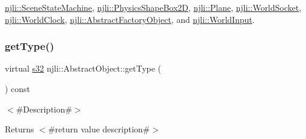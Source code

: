 \mbox{\hyperlink{classnjli_1_1_scene_state_machine_a5a3f221a1b765b690d2cfd45e8a5e574}{njli\+::\+Scene\+State\+Machine}}, \mbox{\hyperlink{classnjli_1_1_physics_shape_box2_d_a176b8cfb4df192e48295adc6e97a1e8d}{njli\+::\+Physics\+Shape\+Box2D}}, \mbox{\hyperlink{classnjli_1_1_plane_a9a7ccbc86c1f486cd816f0f4f3e9c550}{njli\+::\+Plane}}, \mbox{\hyperlink{classnjli_1_1_world_socket_a5a98ed3511ee0c2784ad14e36a6a6fd0}{njli\+::\+World\+Socket}}, \mbox{\hyperlink{classnjli_1_1_world_clock_a3d049ae0564d07c40cc0f9a3d5ccf20e}{njli\+::\+World\+Clock}}, \mbox{\hyperlink{classnjli_1_1_abstract_factory_object_af4151e41b80d5bc3fc42822c67fc2278}{njli\+::\+Abstract\+Factory\+Object}}, and \mbox{\hyperlink{classnjli_1_1_world_input_a52568419faf8a25092f2261640598d63}{njli\+::\+World\+Input}}.

\mbox{\label{classnjli_1_1_abstract_object_a08dcf202a47f0782813b8bc98c659e78}} 
\subsubsection{\texorpdfstring{get\+Type()}{getType()}}
{\footnotesize\ttfamily virtual \mbox{\hyperlink{_util_8h_aa62c75d314a0d1f37f79c4b73b2292e2}{s32}} njli\+::\+Abstract\+Object\+::get\+Type (\begin{DoxyParamCaption}{ }\end{DoxyParamCaption}) const\hspace{0.3cm}{\ttfamily [pure virtual]}}

$<$\#\+Description\#$>$

\begin{DoxyReturn}{Returns}
$<$\#return value description\#$>$ 
\end{DoxyReturn}


